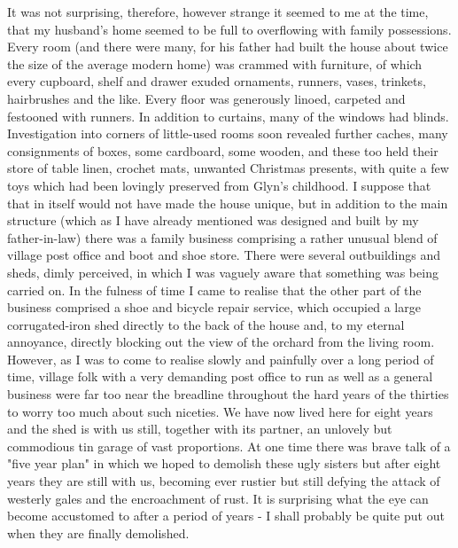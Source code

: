 It was not surprising, therefore, however strange it seemed to me at the time, that my husband's home seemed to be full to overflowing with family possessions. Every room (and there were many, for his father had built the house about twice the size of the average modern home) was crammed with furniture, of which every cupboard, shelf and drawer exuded ornaments, runners, vases, trinkets, hairbrushes and the like. Every floor was generously linoed, carpeted and festooned with runners. In addition to curtains, many of the windows had blinds. Investigation into corners of little-used rooms soon revealed further caches, many consignments of boxes, some cardboard, some wooden, and these too held their store of table linen, crochet mats, unwanted Christmas presents, with quite a few toys which had been lovingly preserved from Glyn's childhood. I suppose that that in itself would not have made the house unique, but in addition to the main structure (which as I have already mentioned was designed and built by my father-in-law) there was a family business comprising a rather unusual blend of village post office and boot and shoe store. There were several outbuildings and sheds, dimly perceived, in which I was vaguely aware that something was being carried on. In the fulness of time I came to realise that the other part of the business comprised a shoe and bicycle repair service, which occupied a large corrugated-iron shed directly to the back of the house and, to my eternal annoyance, directly blocking out the view of the orchard from the living room. However, as I was to come to realise slowly and painfully over a long period of time, village folk with a very demanding post office to run as well as a general business were far too near the breadline throughout the hard years of the thirties to worry too much about such niceties. We have now lived here for eight years and the shed is with us still, together with its partner, an unlovely but commodious tin garage of vast proportions. At one time there was brave talk of a "five year plan" in which we hoped to demolish these ugly sisters but after eight years they are still with us, becoming ever rustier but still defying the attack of westerly gales and the encroachment of rust. It is surprising what the eye can become accustomed to after a period of years - I shall probably be quite put out when they are finally demolished.

